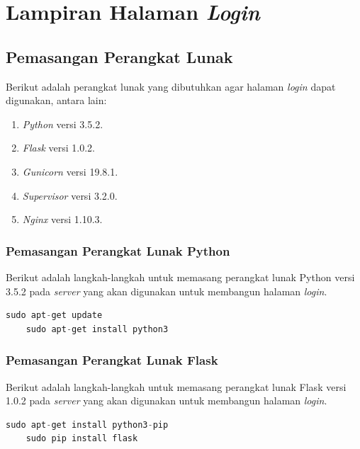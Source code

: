 \renewcommand\chaptername{LAMPIRAN}
\chapter{Lampiran Halaman \textit{Login}}
\section{Pemasangan Perangkat Lunak}
\label{lampiranisntalasihalamanlogin}
Berikut adalah perangkat lunak yang dibutuhkan agar halaman \textit{login} dapat digunakan, antara lain:
\begin{enumerate}
	\item \textit{Python} versi 3.5.2.
	\item \textit{Flask} versi 1.0.2.
	\item \textit{Gunicorn} versi 19.8.1.
	\item \textit{Supervisor} versi 3.2.0.
	\item \textit{Nginx} versi 1.10.3.
\end{enumerate}

\subsection{Pemasangan Perangkat Lunak Python}
Berikut adalah langkah-langkah untuk memasang perangkat lunak Python versi 3.5.2 pada \textit{server} yang akan digunakan untuk membangun halaman \textit{login}.\\
\begin{minipage}{\linewidth}
	\begin{lstlisting}[caption=Command untuk installasi Python,language=Python,label=installpython3diserverlogin]
	sudo apt-get update
	sudo apt-get install python3
	\end{lstlisting}
\end{minipage}

\subsection{Pemasangan Perangkat Lunak Flask}
Berikut adalah langkah-langkah untuk memasang perangkat lunak Flask versi 1.0.2 pada \textit{server} yang akan digunakan untuk membangun halaman \textit{login}.\\
\begin{minipage}{\linewidth}
	\begin{lstlisting}[caption=Command untuk installasi Flask,language=Python,label=installflaskdiserverlogin]
	sudo apt-get install python3-pip
	sudo pip install flask
	\end{lstlisting}
\end{minipage}

